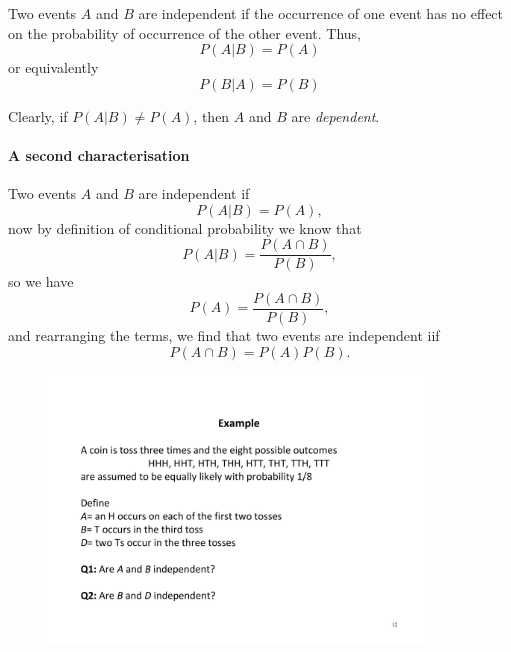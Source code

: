 \documentclass[notes=show,handout]{beamer}\usepackage[]{graphicx}\usepackage[]{color}
\begin{document}
\begin{frame}{\secname}
  \begin{definition}
  Two events $A$ and $B$ are independent if the occurrence of one event has no effect on the probability of occurrence of the other event. Thus,
  $$
  P(A\vert B) = P(A)
  $$
  or equivalently
  $$
  P(B\vert A) = P(B)
  $$
  \end{definition}
  Clearly, if $P(A\vert B) \neq P(A)$, then $A$ and $B$ are \textit{dependent}.
\end{frame}


\begin{frame}{\secname}
  \framesubtitle{A second characterisation}
  Two events $A$ and $B$ are independent if
  $$
  P(A \vert B) = {P(A)},
  $$
  now by definition of conditional probability we know that
  $$
  P(A \vert B) = \frac{P(A \cap B)}{P(B)},
  $$
  so we have
  $$
  P(A) = \frac{P(A \cap B)}{P(B)},
  $$
  and rearranging the terms, we find that two events are independent iif
  $$
  P(A\cap B) = P(A) P(B).
  $$
\end{frame}

\begin{frame}{\secname}
  \begin{example}
  \begin{figure}[h!]
  \centering
  \includegraphics[width=0.9\textwidth,height=0.7\textheight]{img/example7.pdf}
  \end{figure}
  \end{example}
\end{frame}
\end{document}
